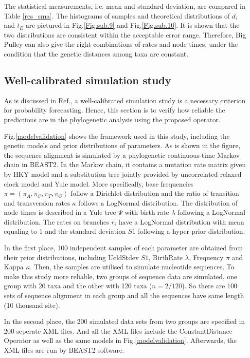 \documentclass{bmcart}
\begin{document}
The statistical measurements, i.e. mean and standard deviation, are compared in Table \ref{res_sma}. The histograms of samples and theoretical distributions of ${d_i}$ and ${t_E}$ are pictured in Fig.\ref{Fig.sub.9} and Fig.\ref{Fig.sub.10}. It is shown that the two distributions are consistent within the acceptable error range. Therefore, Big Pulley can also give the right combinations of rates and node times, under the condition that the genetic distances among taxa are constant.
\subsection*{Well-calibrated simulation study}
As is discussed in Ref.\cite{dawid1982well}, a well-calibrated simulation study is a necessary criterion for probability forecasting. Hence, this section is to verify how reliable the predictions are in the phylogenetic analysis using the proposed operator.

Fig.\ref{modelvalidation} shows the framework used in this study, including the genetic models and prior distributions of parameters. As is shown in the figure, the sequence alignment is simulated by a phylogenetic continuous-time Markov chain in BEAST2. In the Markov chain, it contains a mutation rate matrix given by HKY model and a substitution tree jointly provided by uncorrelated relaxed clock model and Yule model. More specifically, base frequencies $\pi = (\pi_{A}, \pi_{C}, \pi_{T}, \pi_{G})$ follow a Dirichlet distribution and the ratio of transition and transversion rates $\kappa$ follows a LogNormal distribution. The distribution of node times is described in a Yule tree $\Psi$ with birth rate $\lambda $ following a LogNormal distribution. The rates on branches $r_i$ have a LogNormal distribution with mean equaling to 1 and the standard deviation $S1$ following a hyper prior distribution.  

In the first place, 100 independent samples of each parameter are obtained from their prior distributions, including UcldStdev $S1$, BirthRate $\lambda $, Frequency $\pi$ and Kappa $\kappa$. Then, the samples are utilised to simulate nucleotide sequences. To make this study more reliable, two groups of sequence data are simulated, one group with 20 taxa and the other with 120 taxa ($n=2/120$). So there are 100 sets of sequence alignment in each group and all the sequences have same length (10 thousand site). 

In the second place, the 200 simulated data sets from two groups are specified in 200 seperate XML files. And all the XML files include the ConstantDistance Operator as well as the same models in Fig.\ref{modelvalidation}.  Afterwards, the XML files are run by BEAST2 software. 
\end{document}
